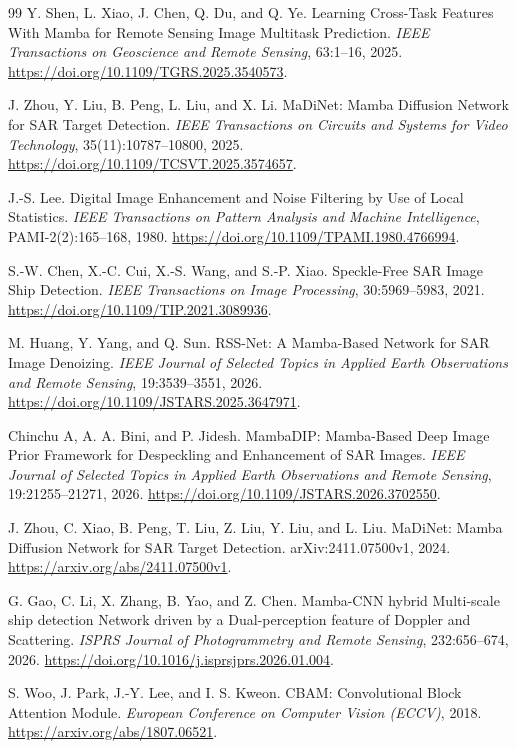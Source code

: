 \documentclass[UTF8,11pt,a4paper,fontset=fandol]{ctexart}
\begin{document}
\begin{thebibliography}{99}
Y. Shen, L. Xiao, J. Chen, Q. Du, and Q. Ye.
Learning Cross-Task Features With Mamba for Remote Sensing Image Multitask Prediction.
\emph{IEEE Transactions on Geoscience and Remote Sensing}, 63:1--16, 2025.
\url{https://doi.org/10.1109/TGRS.2025.3540573}.

J. Zhou, Y. Liu, B. Peng, L. Liu, and X. Li.
MaDiNet: Mamba Diffusion Network for SAR Target Detection.
\emph{IEEE Transactions on Circuits and Systems for Video Technology},
35(11):10787--10800, 2025.
\url{https://doi.org/10.1109/TCSVT.2025.3574657}.

J.-S. Lee.
Digital Image Enhancement and Noise Filtering by Use of Local Statistics.
\emph{IEEE Transactions on Pattern Analysis and Machine Intelligence},
PAMI-2(2):165--168, 1980.
\url{https://doi.org/10.1109/TPAMI.1980.4766994}.

S.-W. Chen, X.-C. Cui, X.-S. Wang, and S.-P. Xiao.
Speckle-Free SAR Image Ship Detection.
\emph{IEEE Transactions on Image Processing}, 30:5969--5983, 2021.
\url{https://doi.org/10.1109/TIP.2021.3089936}.

M. Huang, Y. Yang, and Q. Sun.
RSS-Net: A Mamba-Based Network for SAR Image Denoizing.
\emph{IEEE Journal of Selected Topics in Applied Earth Observations and Remote Sensing},
19:3539--3551, 2026.
\url{https://doi.org/10.1109/JSTARS.2025.3647971}.

Chinchu A, A. A. Bini, and P. Jidesh.
MambaDIP: Mamba-Based Deep Image Prior Framework for Despeckling and Enhancement of SAR Images.
\emph{IEEE Journal of Selected Topics in Applied Earth Observations and Remote Sensing},
19:21255--21271, 2026.
\url{https://doi.org/10.1109/JSTARS.2026.3702550}.

J. Zhou, C. Xiao, B. Peng, T. Liu, Z. Liu, Y. Liu, and L. Liu.
MaDiNet: Mamba Diffusion Network for SAR Target Detection.
arXiv:2411.07500v1, 2024.
\url{https://arxiv.org/abs/2411.07500v1}.

G. Gao, C. Li, X. Zhang, B. Yao, and Z. Chen.
Mamba-CNN hybrid Multi-scale ship detection Network driven by a Dual-perception feature of Doppler and Scattering.
\emph{ISPRS Journal of Photogrammetry and Remote Sensing}, 232:656--674, 2026.
\url{https://doi.org/10.1016/j.isprsjprs.2026.01.004}.

S. Woo, J. Park, J.-Y. Lee, and I. S. Kweon.
CBAM: Convolutional Block Attention Module.
\emph{European Conference on Computer Vision (ECCV)}, 2018.
\url{https://arxiv.org/abs/1807.06521}.


\end{thebibliography}
\end{document}
